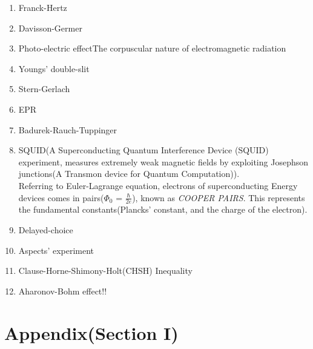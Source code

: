 \documentclass[a4paper, 10pt, onepage]{elegantbook}
\begin{document}
\begin{enumerate}

\item Franck-Hertz
\item Davisson-Germer  
\item Photo-electric effect{The corpuscular nature of electromagnetic radiation}
\item Youngs' double-slit
\item Stern-Gerlach  
\item EPR   
\item Badurek-Rauch-Tuppinger  
\item SQUID(A Superconducting Quantum Interference Device (SQUID) experiment, measures extremely weak magnetic fields by exploiting Josephson junctions(A
Transmon device for Quantum Computation)). \\

Referring to Euler-Lagrange equation, electrons of superconducting Energy devices comes in pairs($\Phi_0$ = $\frac{\hbar}{2e}$), known as \emph{COOPER PAIRS}. This represents the fundamental constants(Plancks' constant, and the charge of the electron).  \\



\item Delayed-choice
\item Aspects' experiment
\item Clause-Horne-Shimony-Holt(CHSH) Inequality
\item Aharonov-Bohm effect!!
\end{enumerate}


\chapter{Appendix(Section I)}
\end{document}
